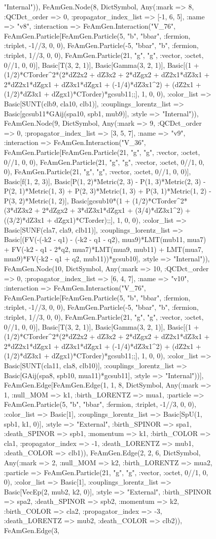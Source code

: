 \documentclass{revtex4}
\begin{document}
\begin{figure}[!htb]
\begin{center}
{"Internal")), FeAmGen.Node(8, Dict{Symbol, Any}(:mark => 8, :QCDct_order => 0, :propagator_index_list => [-1, 6, 5], :name => "v8", :interaction => FeAmGen.Interaction("V_76", FeAmGen.Particle[FeAmGen.Particle(5, "b", "bbar", :fermion, :triplet, -1//3, 0, 0), FeAmGen.Particle(-5, "bbar", "b", :fermion, :triplet, 1//3, 0, 0), FeAmGen.Particle(21, "g", "g", :vector, :octet, 0//1, 0, 0)], Basic[T(3, 2, 1)], Basic[Gamma(3, 2, 1)], Basic[(1 + (1/2)*CTorder^2*(2*dZ2x2 + dZ3x2 + 2*dZgx2 + dZ2x1*dZ3x1 + 2*dZ2x1*dZgx1 + dZ3x1*dZgx1 + (-1/4)*dZ3x1^2) + (dZ2x1 + (1/2)*dZ3x1 + dZgx1)*CTorder)*gcsub11;;], 1, 0, 0), :color_list => Basic[SUNT(clb9, cla10, clb1)], :couplings_lorentz_list => Basic[gcsub11*GAij(spa10, spb1, mub9)], :style => "Internal")), FeAmGen.Node(9, Dict{Symbol, Any}(:mark => 9, :QCDct_order => 0, :propagator_index_list => [3, 5, 7], :name => "v9", :interaction => FeAmGen.Interaction("V_36", FeAmGen.Particle[FeAmGen.Particle(21, "g", "g", :vector, :octet, 0//1, 0, 0), FeAmGen.Particle(21, "g", "g", :vector, :octet, 0//1, 0, 0), FeAmGen.Particle(21, "g", "g", :vector, :octet, 0//1, 0, 0)], Basic[f(1, 2, 3)], Basic[P(1, 2)*Metric(2, 3) - P(1, 3)*Metric(2, 3) - P(2, 1)*Metric(1, 3) + P(2, 3)*Metric(1, 3) + P(3, 1)*Metric(1, 2) - P(3, 2)*Metric(1, 2)], Basic[gcsub10*(1 + (1/2)*CTorder^2*(3*dZ3x2 + 2*dZgx2 + 3*dZ3x1*dZgx1 + (3/4)*dZ3x1^2) + ((3/2)*dZ3x1 + dZgx1)*CTorder);;], 1, 0, 0), :color_list => Basic[SUNF(cla7, cla9, clb11)], :couplings_lorentz_list => Basic[(FV(-(-k2 - q1) - (-k2 - q1 - q2), mua9)*LMT(mub11, mua7) + FV(-k2 - q1 - 2*q2, mua7)*LMT(mua9, mub11) + LMT(mua7, mua9)*FV(-k2 - q1 + q2, mub11))*gcsub10], :style => "Internal")), FeAmGen.Node(10, Dict{Symbol, Any}(:mark => 10, :QCDct_order => 0, :propagator_index_list => [6, 4, 7], :name => "v10", :interaction => FeAmGen.Interaction("V_76", FeAmGen.Particle[FeAmGen.Particle(5, "b", "bbar", :fermion, :triplet, -1//3, 0, 0), FeAmGen.Particle(-5, "bbar", "b", :fermion, :triplet, 1//3, 0, 0), FeAmGen.Particle(21, "g", "g", :vector, :octet, 0//1, 0, 0)], Basic[T(3, 2, 1)], Basic[Gamma(3, 2, 1)], Basic[(1 + (1/2)*CTorder^2*(2*dZ2x2 + dZ3x2 + 2*dZgx2 + dZ2x1*dZ3x1 + 2*dZ2x1*dZgx1 + dZ3x1*dZgx1 + (-1/4)*dZ3x1^2) + (dZ2x1 + (1/2)*dZ3x1 + dZgx1)*CTorder)*gcsub11;;], 1, 0, 0), :color_list => Basic[SUNT(cla11, cla8, clb10)], :couplings_lorentz_list => Basic[GAij(spa8, spb10, mua11)*gcsub11], :style => "Internal"))], FeAmGen.Edge[FeAmGen.Edge(1, 1, 8, Dict{Symbol, Any}(:mark => 1, :null_MOM => k1, :birth_LORENTZ => mua1, :particle => FeAmGen.Particle(5, "b", "bbar", :fermion, :triplet, -1//3, 0, 0), :color_list => Basic[1], :couplings_lorentz_list => Basic[SpU(1, spb1, k1, 0)], :style => "External", :birth_SPINOR => spa1, :death_SPINOR => spb1, :momentum => k1, :birth_COLOR => cla1, :propagator_index => -1, :death_LORENTZ => mub1, :death_COLOR => clb1)), FeAmGen.Edge(2, 2, 6, Dict{Symbol, Any}(:mark => 2, :null_MOM => k2, :birth_LORENTZ => mua2, :particle => FeAmGen.Particle(21, "g", "g", :vector, :octet, 0//1, 0, 0), :color_list => Basic[1], :couplings_lorentz_list => Basic[VecEp(2, mub2, k2, 0)], :style => "External", :birth_SPINOR => spa2, :death_SPINOR => spb2, :momentum => k2, :birth_COLOR => cla2, :propagator_index => -3, :death_LORENTZ => mub2, :death_COLOR => clb2)), FeAmGen.Edge(3, }
\end{center}
\end{figure}
\end{document}

